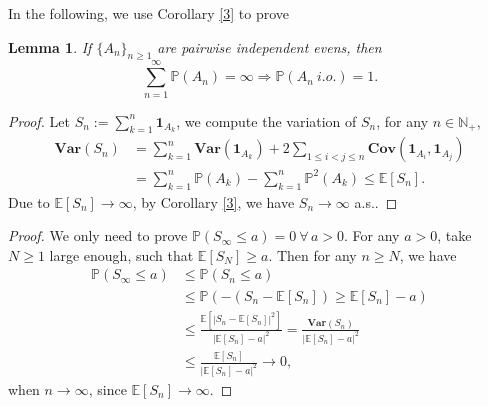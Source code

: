 \documentclass[11pt]{article}
\newtheorem{lemma}[theorem]{Lemma}
\theoremstyle{definition}
\newcommand{\abs}[1]{\left\vert#1\right\vert}
\begin{document}
In the following, we use  Corollary \ref{3} to prove
\begin{lemma}
    If $\{A_n\}_{n\ge 1}$ are  pairwise independent evens, then 
\[
\sum^\infty_{n=1} \mathbb{P}(A_n)=\infty \Rightarrow \mathbb{P}(A_n\ i.o.)=1.
\]
\end{lemma}
{\color{blue}\begin{proof}
Let $S_n:= \sum^{n}_{k=1} \mathbf{1}_{A_k}$, we compute the variation of $S_n$, for any $n\in \mathbb{N}_+$, 
\begin{equation*}
  \begin{aligned}
    \mathbf{Var}(S_n)  &=\sum^n_{k=1} \mathbf{Var}(\mathbf{1}_{A_k}) +2\sum_{1\le i< j\le n} \mathbf{Cov}(\mathbf{1}_{A_i},\mathbf{1}_{A_j})\\
&= \sum^n_{k=1}\mathbb{P}(A_k)- \sum^n_{k=1}\mathbb{P}^2(A_k)\le \mathbb{E}[S_n].
  \end{aligned}
\end{equation*}
Due to $\mathbb{E}[S_n]\rightarrow \infty$, by Corollary \ref{3}, we have $S_n\rightarrow \infty$ a.s..
\end{proof}}
\begin{proof}
  We only need to prove $\mathbb{P}(S_\infty\le a)=0\ \forall\,a>0$.  For any $a>0$, take $N\ge 1$ large enough, such that $\mathbb{E}[S_N]\ge a$. Then for any $n\ge N$, we have
\begin{equation*}
  \begin{aligned}
  \mathbb{P}(S_\infty\le a) &\le \mathbb{P}(S_n\le a)\\ 
&\le \mathbb{P}(-(S_n-\mathbb{E}[S_n])\ge \mathbb{E}[S_n]-a)\\ 
&\le \frac{\mathbb{E}[
\abs{S_n-\mathbb{E}[S_n]}^2]}{\abs{\mathbb{E}[S_n]-a}^2}=\frac{\mathbf{Var}(S_n)}{\abs{\mathbb{E}[S_n]-a}^2}\\ 
&\le \frac{\mathbb{E}[S_n]}{\abs{\mathbb{E}[S_n]-a}^2}\rightarrow 0,
  \end{aligned}
\end{equation*}
when $n\rightarrow \infty$, since $\mathbb{E}[S_n]\rightarrow \infty$.
\end{proof}
\end{document}
